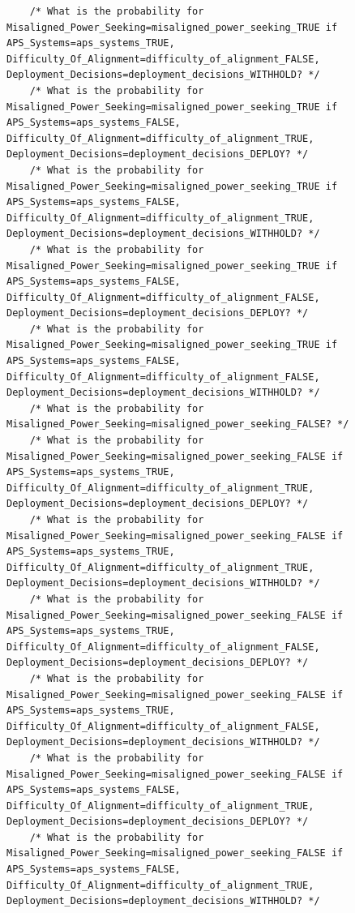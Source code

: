 \documentclass[
  11pt,
  letterpaper,
]{book}
\begin{document}
\begin{verbatim}
    /* What is the probability for Misaligned_Power_Seeking=misaligned_power_seeking_TRUE if APS_Systems=aps_systems_TRUE, Difficulty_Of_Alignment=difficulty_of_alignment_FALSE, Deployment_Decisions=deployment_decisions_WITHHOLD? */
    /* What is the probability for Misaligned_Power_Seeking=misaligned_power_seeking_TRUE if APS_Systems=aps_systems_FALSE, Difficulty_Of_Alignment=difficulty_of_alignment_TRUE, Deployment_Decisions=deployment_decisions_DEPLOY? */
    /* What is the probability for Misaligned_Power_Seeking=misaligned_power_seeking_TRUE if APS_Systems=aps_systems_FALSE, Difficulty_Of_Alignment=difficulty_of_alignment_TRUE, Deployment_Decisions=deployment_decisions_WITHHOLD? */
    /* What is the probability for Misaligned_Power_Seeking=misaligned_power_seeking_TRUE if APS_Systems=aps_systems_FALSE, Difficulty_Of_Alignment=difficulty_of_alignment_FALSE, Deployment_Decisions=deployment_decisions_DEPLOY? */
    /* What is the probability for Misaligned_Power_Seeking=misaligned_power_seeking_TRUE if APS_Systems=aps_systems_FALSE, Difficulty_Of_Alignment=difficulty_of_alignment_FALSE, Deployment_Decisions=deployment_decisions_WITHHOLD? */
    /* What is the probability for Misaligned_Power_Seeking=misaligned_power_seeking_FALSE? */
    /* What is the probability for Misaligned_Power_Seeking=misaligned_power_seeking_FALSE if APS_Systems=aps_systems_TRUE, Difficulty_Of_Alignment=difficulty_of_alignment_TRUE, Deployment_Decisions=deployment_decisions_DEPLOY? */
    /* What is the probability for Misaligned_Power_Seeking=misaligned_power_seeking_FALSE if APS_Systems=aps_systems_TRUE, Difficulty_Of_Alignment=difficulty_of_alignment_TRUE, Deployment_Decisions=deployment_decisions_WITHHOLD? */
    /* What is the probability for Misaligned_Power_Seeking=misaligned_power_seeking_FALSE if APS_Systems=aps_systems_TRUE, Difficulty_Of_Alignment=difficulty_of_alignment_FALSE, Deployment_Decisions=deployment_decisions_DEPLOY? */
    /* What is the probability for Misaligned_Power_Seeking=misaligned_power_seeking_FALSE if APS_Systems=aps_systems_TRUE, Difficulty_Of_Alignment=difficulty_of_alignment_FALSE, Deployment_Decisions=deployment_decisions_WITHHOLD? */
    /* What is the probability for Misaligned_Power_Seeking=misaligned_power_seeking_FALSE if APS_Systems=aps_systems_FALSE, Difficulty_Of_Alignment=difficulty_of_alignment_TRUE, Deployment_Decisions=deployment_decisions_DEPLOY? */
    /* What is the probability for Misaligned_Power_Seeking=misaligned_power_seeking_FALSE if APS_Systems=aps_systems_FALSE, Difficulty_Of_Alignment=difficulty_of_alignment_TRUE, Deployment_Decisions=deployment_decisions_WITHHOLD? */

\end{verbatim}
\end{document}
